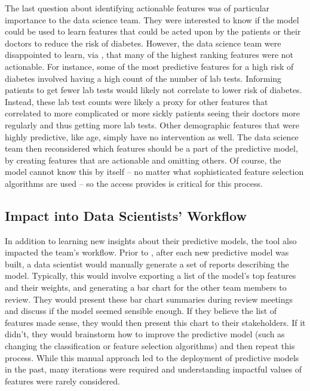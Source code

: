 The last question about identifying actionable features was of particular importance to the data science team.  They were interested to know if the model could be used to learn features that could be acted upon by the patients or their doctors to reduce the risk of diabetes.  However, the data science team were disappointed to learn, via \prospector, that many of the highest ranking features were not actionable.  For instance, some of the most predictive features for a high risk of diabetes involved having a high count of the number of lab tests.  Informing patients to get fewer lab tests would likely not correlate to lower risk of diabetes.  Instead, these lab test counts were likely a proxy for other features that correlated to more complicated or more sickly patients seeing their doctors more regularly and thus getting more lab tests.  Other demographic features that were highly predictive, like age, simply have no intervention as well.  The data science team then reconsidered which features should be a part of the predictive model, by creating features that are actionable and omitting others.  Of course, the model cannot know this by itself -- no matter what sophisticated feature selection algorithms are used -- so the access \prospector provides is critical for this process.

\subsection{Impact into Data Scientists' Workflow}

In addition to learning new insights about their predictive models, the tool also impacted the team's workflow.  Prior to \prospector, after each new predictive model was built, a data scientist would manually generate a set of reports describing the model.  Typically, this would involve exporting a list of the model's top features and their weights, and generating a bar chart for the other team members to review.  They would present these bar chart summaries during review meetings and discuss if the model seemed sensible enough.  If they believe the list of features made sense, they would then present this chart to their stakeholders.  If it didn't, they would brainstorm how to improve the predictive model (such as changing the classification or feature selection algorithms) and then repeat this process.  While this manual approach led to the deployment of predictive models in the past, many iterations were required and understanding impactful values of features were rarely considered.

